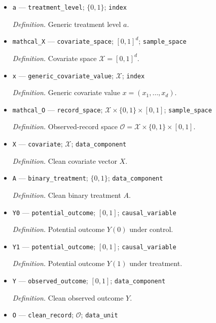 \documentclass{article}
\begin{document}
\begin{itemize}
  \item \texttt{a} --- \texttt{treatment\_\allowbreak{}level}; \(\{0,1\}\); \texttt{index}
  \par\smallskip\noindent\emph{Definition.} Generic treatment level \(a\).
  \item \texttt{mathcal\_\allowbreak{}X} --- \texttt{covariate\_\allowbreak{}space}; \([0,1]^d\); \texttt{sample\_\allowbreak{}space}
  \par\smallskip\noindent\emph{Definition.} Covariate space \(\mathcal X=[0,1]^d\).
  \item \texttt{x} --- \texttt{generic\_\allowbreak{}covariate\_\allowbreak{}value}; \(\mathcal X\); \texttt{index}
  \par\smallskip\noindent\emph{Definition.} Generic covariate value \(x=(x_1,\ldots,x_d)\).
  \item \texttt{mathcal\_\allowbreak{}O} --- \texttt{record\_\allowbreak{}space}; \(\mathcal X\times\{0,1\}\times[0,1]\); \texttt{sample\_\allowbreak{}space}
  \par\smallskip\noindent\emph{Definition.} Observed-record space \(\mathcal O=\mathcal X\times\{0,1\}\times[0,1]\).
  \item \texttt{X} --- \texttt{covariate}; \(\mathcal X\); \texttt{data\_\allowbreak{}component}
  \par\smallskip\noindent\emph{Definition.} Clean covariate vector \(X\).
  \item \texttt{A} --- \texttt{binary\_\allowbreak{}treatment}; \(\{0,1\}\); \texttt{data\_\allowbreak{}component}
  \par\smallskip\noindent\emph{Definition.} Clean binary treatment \(A\).
  \item \texttt{Y0} --- \texttt{potential\_\allowbreak{}outcome}; \([0,1]\); \texttt{causal\_\allowbreak{}variable}
  \par\smallskip\noindent\emph{Definition.} Potential outcome \(Y(0)\) under control.
  \item \texttt{Y1} --- \texttt{potential\_\allowbreak{}outcome}; \([0,1]\); \texttt{causal\_\allowbreak{}variable}
  \par\smallskip\noindent\emph{Definition.} Potential outcome \(Y(1)\) under treatment.
  \item \texttt{Y} --- \texttt{observed\_\allowbreak{}outcome}; \([0,1]\); \texttt{data\_\allowbreak{}component}
  \par\smallskip\noindent\emph{Definition.} Clean observed outcome \(Y\).
  \item \texttt{O} --- \texttt{clean\_\allowbreak{}record}; \(\mathcal O\); \texttt{data\_\allowbreak{}unit}

\end{itemize}
\end{document}
